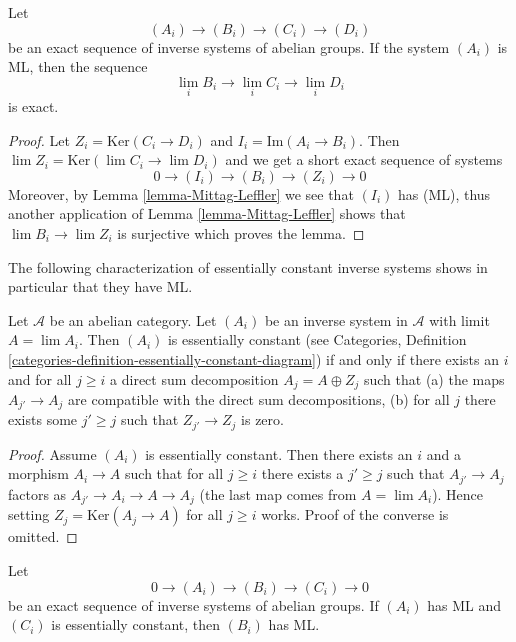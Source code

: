 \begin{lemma}
\label{lemma-apply-Mittag-Leffler}
Let
$$
(A_i) \to (B_i) \to (C_i) \to (D_i)
$$
be an exact sequence of inverse systems of abelian groups. If the
system $(A_i)$ is ML, then the sequence
$$
\lim_i B_i \to \lim_i C_i \to \lim_i D_i
$$
is exact.
\end{lemma}

\begin{proof}
Let $Z_i = \text{Ker}(C_i \to D_i)$ and $I_i = \text{Im}(A_i \to B_i)$.
Then $\lim Z_i = \text{Ker}(\lim C_i \to \lim D_i)$ and
we get a short exact sequence of systems
$$
0 \to (I_i) \to (B_i) \to (Z_i) \to 0
$$
Moreover, by
Lemma \ref{lemma-Mittag-Leffler}
we see that $(I_i)$ has (ML), thus another application of
Lemma \ref{lemma-Mittag-Leffler}
shows that $\lim B_i \to \lim Z_i$ is surjective which
proves the lemma.
\end{proof}

\noindent
The following characterization of essentially constant inverse systems
shows in particular that they have ML.

\begin{lemma}
\label{lemma-essentially-constant}
Let $\mathcal{A}$ be an abelian category.
Let $(A_i)$ be an inverse system in $\mathcal{A}$ with limit $A = \lim A_i$.
Then $(A_i)$ is essentially constant (see
Categories, Definition
\ref{categories-definition-essentially-constant-diagram})
if and only if there exists an $i$ and for all $j \geq i$ a direct sum
decomposition $A_j = A \oplus Z_j$ such that
(a) the maps $A_{j'} \to A_j$ are compatible with the direct sum
decompositions, (b) for all $j$ there exists some $j' \geq j$ such that
$Z_{j'} \to Z_j$ is zero.
\end{lemma}

\begin{proof}
Assume $(A_i)$ is essentially constant. Then there exists an $i$ and
a morphism $A_i \to A$ such that for all $j \geq i$ there exists
a $j' \geq j$ such that $A_{j'} \to A_j$ factors as
$A_{j'} \to A_i \to A \to A_j$ (the last map comes from $A = \lim A_i$).
Hence setting $Z_j = \text{Ker}(A_j \to A)$ for all $j \geq i$ works.
Proof of the converse is omitted.
\end{proof}

\begin{lemma}
\label{lemma-exact-sequence-ML}
Let
$$
0 \to (A_i) \to (B_i) \to (C_i) \to 0
$$
be an exact sequence of inverse systems of abelian groups.
If $(A_i)$ has ML and $(C_i)$ is essentially constant, then $(B_i)$ has ML.
\end{lemma}

